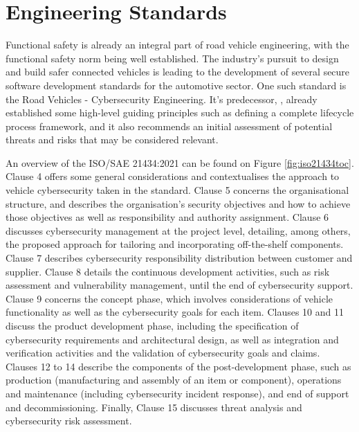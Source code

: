 \section{Engineering Standards}

Functional safety is already an integral part of road vehicle engineering, with the functional safety norm \cite{ISO26262} being well established. The industry's pursuit to design and build safer connected vehicles is leading to the development of several secure software development standards for the automotive sector. One such standard is the \cite{ISO21434} Road Vehicles - Cybersecurity Engineering. It's predecessor, \cite{SAEJ3061}, already established some high-level guiding principles such as defining a complete lifecycle process framework, and it also recommends an initial assessment of potential threats and risks that may be considered relevant.\par
An overview of the ISO/SAE 21434:2021 can be found on Figure \ref{fig:iso21434toc}. Clause 4 offers some general considerations and contextualises the approach to vehicle cybersecurity taken in the standard. Clause 5 concerns the organisational structure, and describes the organisation's security objectives and how to achieve those objectives as well as responsibility and authority assignment. Clause 6 discusses cybersecurity management at the project level, detailing, among others, the proposed approach for tailoring and incorporating off-the-shelf components. Clause 7 describes cybersecurity responsibility distribution between customer and supplier. Clause 8 details the continuous development activities, such as risk assessment and vulnerability management, until the end of cybersecurity support. Clause 9 concerns the concept phase, which involves considerations of vehicle functionality as well as the cybersecurity goals for each item. Clauses 10 and 11 discuss the product development phase, including the specification of cybersecurity requirements and architectural design, as well as integration and verification activities and the validation of cybersecurity goals and claims. Clauses 12 to 14 describe the components of the post-development phase, such as production (manufacturing and assembly of an item or component), operations and maintenance (including cybersecurity incident response), and end of support and decommissioning. Finally, Clause 15 discusses threat analysis and cybersecurity risk assessment.

